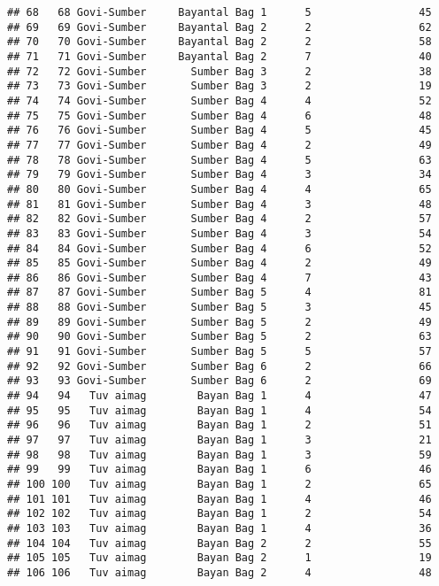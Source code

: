 \documentclass[
]{article}
\begin{document}
\begin{verbatim}
## 68   68 Govi-Sumber     Bayantal Bag 1      5                 45
## 69   69 Govi-Sumber     Bayantal Bag 2      2                 62
## 70   70 Govi-Sumber     Bayantal Bag 2      2                 58
## 71   71 Govi-Sumber     Bayantal Bag 2      7                 40
## 72   72 Govi-Sumber       Sumber Bag 3      2                 38
## 73   73 Govi-Sumber       Sumber Bag 3      2                 19
## 74   74 Govi-Sumber       Sumber Bag 4      4                 52
## 75   75 Govi-Sumber       Sumber Bag 4      6                 48
## 76   76 Govi-Sumber       Sumber Bag 4      5                 45
## 77   77 Govi-Sumber       Sumber Bag 4      2                 49
## 78   78 Govi-Sumber       Sumber Bag 4      5                 63
## 79   79 Govi-Sumber       Sumber Bag 4      3                 34
## 80   80 Govi-Sumber       Sumber Bag 4      4                 65
## 81   81 Govi-Sumber       Sumber Bag 4      3                 48
## 82   82 Govi-Sumber       Sumber Bag 4      2                 57
## 83   83 Govi-Sumber       Sumber Bag 4      3                 54
## 84   84 Govi-Sumber       Sumber Bag 4      6                 52
## 85   85 Govi-Sumber       Sumber Bag 4      2                 49
## 86   86 Govi-Sumber       Sumber Bag 4      7                 43
## 87   87 Govi-Sumber       Sumber Bag 5      4                 81
## 88   88 Govi-Sumber       Sumber Bag 5      3                 45
## 89   89 Govi-Sumber       Sumber Bag 5      2                 49
## 90   90 Govi-Sumber       Sumber Bag 5      2                 63
## 91   91 Govi-Sumber       Sumber Bag 5      5                 57
## 92   92 Govi-Sumber       Sumber Bag 6      2                 66
## 93   93 Govi-Sumber       Sumber Bag 6      2                 69
## 94   94   Tuv aimag        Bayan Bag 1      4                 47
## 95   95   Tuv aimag        Bayan Bag 1      4                 54
## 96   96   Tuv aimag        Bayan Bag 1      2                 51
## 97   97   Tuv aimag        Bayan Bag 1      3                 21
## 98   98   Tuv aimag        Bayan Bag 1      3                 59
## 99   99   Tuv aimag        Bayan Bag 1      6                 46
## 100 100   Tuv aimag        Bayan Bag 1      2                 65
## 101 101   Tuv aimag        Bayan Bag 1      4                 46
## 102 102   Tuv aimag        Bayan Bag 1      2                 54
## 103 103   Tuv aimag        Bayan Bag 1      4                 36
## 104 104   Tuv aimag        Bayan Bag 2      2                 55
## 105 105   Tuv aimag        Bayan Bag 2      1                 19
## 106 106   Tuv aimag        Bayan Bag 2      4                 48

\end{verbatim}
\end{document}

